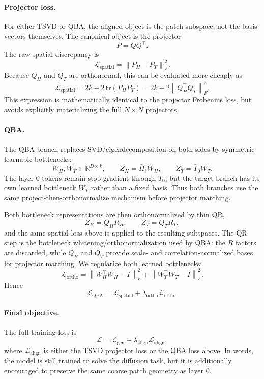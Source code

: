 \documentclass[11pt]{article}
\begin{document}
\paragraph{Projector loss.}
For either TSVD or QBA, the aligned object is the patch subspace, not the basis vectors themselves. The canonical object is the projector
\[
P = QQ^\top.
\]
The raw spatial discrepancy is
\[
\mathcal{L}_{\mathrm{spatial}}
=
\left\| P_H - P_T \right\|_F^2.
\]
Because $Q_H$ and $Q_T$ are orthonormal, this can be evaluated more cheaply as
\[
\mathcal{L}_{\mathrm{spatial}}
=
2k - 2\,\mathrm{tr}(P_H P_T)
=
2k - 2\left\|Q_H^\top Q_T\right\|_F^2.
\]
This expression is mathematically identical to the projector Frobenius loss, but avoids explicitly materializing the full $N \times N$ projectors.

\paragraph{QBA.}
The QBA branch replaces SVD/eigendecomposition on both sides by symmetric
learnable bottlenecks:
\[
W_H,W_T \in \mathbb{R}^{D \times k},
\qquad
Z_H = \bar{H}_\ell W_H,
\qquad
Z_T = \bar{T}_0 W_T.
\]
The layer-0 tokens remain stop-gradient through $\bar{T}_0$, but the target
branch has its own learned bottleneck $W_T$ rather than a fixed basis. Thus both
branches use the same project-then-orthonormalize mechanism before projector
matching.

Both bottleneck representations are then orthonormalized by thin QR,
\[
Z_H = Q_H R_H,
\qquad
Z_T = Q_T R_T,
\]
and the same spatial loss above is applied to the resulting subspaces. The QR
step is the bottleneck whitening/orthonormalization used by QBA: the $R$
factors are discarded, while $Q_H$ and $Q_T$ provide scale- and
correlation-normalized bases for projector matching. We regularize both learned
bottlenecks:
\[
\mathcal{L}_{\mathrm{ortho}} =
\left\| W_H^\top W_H - I \right\|_F^2
+
\left\| W_T^\top W_T - I \right\|_F^2.
\]
Hence
\[
\mathcal{L}_{\mathrm{QBA}} =
\mathcal{L}_{\mathrm{spatial}}
+
\lambda_{\mathrm{ortho}}\mathcal{L}_{\mathrm{ortho}}.
\]

\paragraph{Final objective.}
The full training loss is
\[
\mathcal{L}
=
\mathcal{L}_{\mathrm{gen}}
+
\lambda_{\mathrm{align}}\mathcal{L}_{\mathrm{align}},
\]
where $\mathcal{L}_{\mathrm{align}}$ is either the TSVD projector loss or the QBA loss above. In words, the model is still trained to solve the diffusion task, but it is additionally encouraged to preserve the same coarse patch geometry as layer 0.
\end{document}
